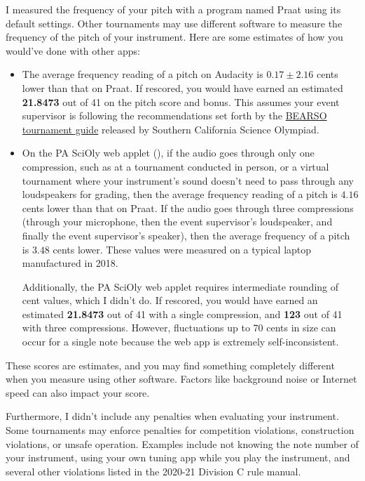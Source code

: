 \documentclass[12pt,letterpaper]{article}
\def\audacityEstimate{21.8473}
\def\pasciolyEstimate{21.8473}
\def\pasciolyEstimateTC{123}
\begin{document}
I measured the frequency of your pitch with a program named Praat using its default settings. Other tournaments may use different software to measure the frequency of the pitch of your instrument. Here are some estimates of how you would've done with other apps:
\begin{itemize}
\item The average frequency reading of a pitch on Audacity is $0.17\pm2.16
$ cents lower than that on Praat. If rescored, you would have earned an estimated \textbf{\audacityEstimate} out of 41 on the pitch score and bonus. This assumes your event supervisor is following the recommendations set forth by the \href{https://docs.google.com/document/d/1VBmM2NzHvc5F2ZHKz4Warf_NGrkn1ADL1Gx0DPHVrJ4/edit#bookmark=id.lu1jk8vh7g7z}{BEARSO tournament guide} released by Southern California Science Olympiad.


\item On the PA SciOly web applet (), if the audio goes through only one compression, such as at a tournament conducted in person, or a virtual tournament where your instrument's sound doesn't need to pass through any loudspeakers for grading, then the average frequency reading of a pitch is $4.16$ cents lower than that on Praat.  If the audio goes through three compressions (through your microphone, then the event supervisor's loudspeaker, and finally the event supervisor's speaker), then the average frequency of a pitch is $3.48$ cents lower. These values were measured on a typical laptop manufactured in 2018. %

Additionally, the PA SciOly web applet requires intermediate rounding of cent values, which I didn't do. If rescored, you would have earned an estimated \textbf{\pasciolyEstimate} out of 41 with a single compression, and \textbf{\pasciolyEstimateTC} out of 41 with three compressions. However, fluctuations up to 70 cents in size can occur for a single note because the web app is extremely self-inconsistent.
\end{itemize}
These scores are estimates, and you may find something completely different when you measure using other software. Factors like background noise or Internet speed can also impact your score.

Furthermore, I didn't include any penalties when evaluating your instrument. Some tournaments may enforce penalties for competition violations, construction violations, or unsafe operation. Examples include not knowing the note number of your instrument, using your own tuning app while you play the instrument, and several other violations listed in the 2020-21 Division C rule manual.
\end{document}
